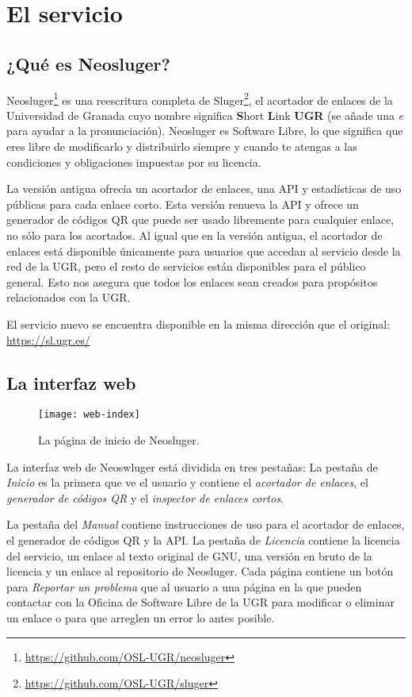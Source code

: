 \chapter{El servicio}\label{el-servicio}

\section{¿Qué es Neosluger?}\label{que-es-neosluger}

Neosluger\footnote{
	\url{https://github.com/OSL-UGR/neosluger}
} es una reescritura completa de Sluger\footnote{
	\url{https://github.com/OSL-UGR/sluger}
},
el acortador de enlaces de la Universidad de Granada cuyo nombre significa \textbf{S}hort \textbf{L}ink \textbf{UGR} (se añade una \textit{e} para ayudar a la pronunciación).
Neosluger es Software Libre, lo que significa que eres libre de modificarlo y distribuirlo siempre y cuando te atengas a las condiciones y obligaciones impuestas por su licencia.

La versión antigua ofrecía un acortador de enlaces, una API y estadísticas de uso públicas para cada enlace corto.
Esta versión renueva la API y ofrece un generador de códigos QR que puede ser usado libremente para cualquier enlace, no sólo para los acortados.
Al igual que en la versión antigua, el acortador de enlaces está disponible únicamente para usuarios que accedan al servicio desde la red de la UGR, pero el resto de servicios están disponibles para el público general.
Esto nos asegura que todos los enlaces sean creados para propósitos relacionados con la UGR.

El servicio nuevo se encuentra disponible en la misma dirección que el original: \url{https://sl.ugr.es/}

\section{La interfaz web}\label{la-interfaz-web}

\begin{figure}[ht!]
	\texttt{[image: web-index]}
	\caption{La página de inicio de Neosluger.}
\end{figure}

La interfaz web de Neoswluger está dividida en tres pestañas:
La pestaña de \textit{Inicio} es la primera que ve el usuario y contiene el \textit{acortador de enlaces}, el \textit{generador de códigos QR} y el \textit{inspector de enlaces cortos}.

La pestaña del \textit{Manual} contiene instrucciones de uso para el acortador de enlaces, el generador de códigos QR y la API.
La pestaña de \textit{Licencia} contiene la licencia del servicio, un enlace al texto original de GNU, una versión en bruto de la licencia y un enlace al repositorio de Neosluger.
Cada página contiene un botón para \textit{Reportar un problema} que al usuario a una página en la que pueden contactar con la Oficina de Software Libre de la UGR para modificar o eliminar un enlace o para que arreglen un error lo antes posible.

